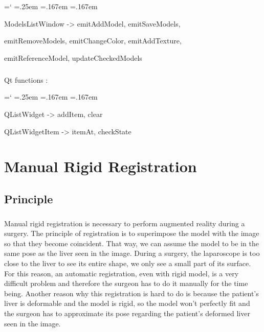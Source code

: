 \documentclass[12pt]{report}
\DeclareRobustCommand*{\ttfamily}{
  \origttfamily
  \hyphenchar\font=`\-\relax
  \fontdimen3\font=.25em\relax
  \fontdimen4\font=.167em\relax
  \fontdimen7\font=.167em\relax
}
\newenvironment{code}{\ttfamily}{}
\begin{document}
	\begin{code}
	ModelsListWindow -> emitAddModel, emitSaveModels,
	
	emitRemoveModels, emitChangeColor, emitAddTexture,
	
	emitReferenceModel,	updateCheckedModels
	\end{code}

\paragraph{}
	Qt functions :

	\begin{code}
	QListWidget -> addItem, clear

	QListWidgetItem -> itemAt, checkState
	\end{code}










\vspace{10pt}
\chapter{Manual Rigid Registration} \label{sec:problem} 


\section{Principle}

\paragraph{}
	Manual rigid registration is necessary to perform augmented reality during a surgery. The principle of registration is to superimpose the model with the image so that they become coincident. That way, we can assume the model to be in the same pose as the liver seen in the image. During a surgery, the laparoscope is too close to the liver to see its entire shape, we only see a small part of its surface. For this reason, an automatic registration, even with rigid model, is a very difficult problem and therefore the surgeon has to do it manually for the time being.
Another reason why this registration is hard to do is because the patient's liver is deformable and the model is rigid, so the model won't perfectly fit and the surgeon has to approximate its pose regarding the patient's deformed liver seen in the image.
\end{document}
